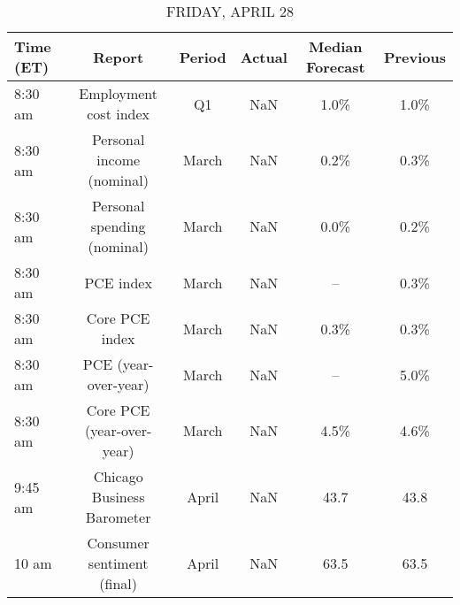 \documentclass{article}%
\begin{document}
\begin{table}[htbp]%
\caption{FRIDAY, APRIL 28}%
\centering%
\begin{adjustbox}{width=1\textwidth}%
\begin{tabular}{lccccc}
\toprule
Time (ET) &                      Report & Period & Actual & Median Forecast & Previous \\
\midrule
  8:30 am &       Employment cost index &     Q1 &    NaN &            1.0\% &     1.0\% \\
  8:30 am &   Personal income (nominal) &  March &    NaN &            0.2\% &     0.3\% \\
  8:30 am & Personal spending (nominal) &  March &    NaN &            0.0\% &     0.2\% \\
  8:30 am &                   PCE index &  March &    NaN &              -- &     0.3\% \\
  8:30 am &              Core PCE index &  March &    NaN &            0.3\% &     0.3\% \\
  8:30 am &        PCE (year-over-year) &  March &    NaN &              -- &     5.0\% \\
  8:30 am &   Core PCE (year-over-year) &  March &    NaN &            4.5\% &     4.6\% \\
  9:45 am &  Chicago Business Barometer &  April &    NaN &            43.7 &     43.8 \\
    10 am &  Consumer sentiment (final) &  April &    NaN &            63.5 &     63.5 \\
\bottomrule
\end{tabular}
%
\end{adjustbox}%
\end{table}
\end{document}
